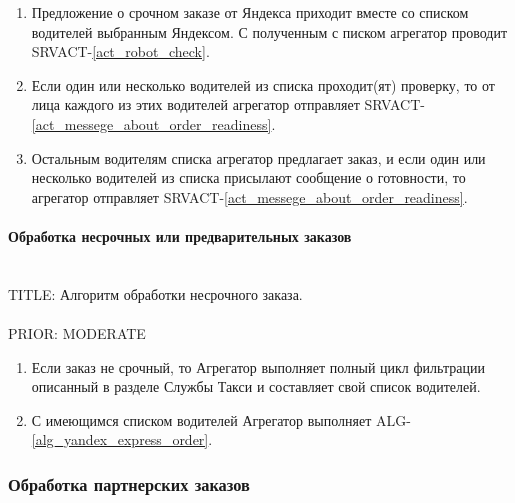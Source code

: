 				\begin{alg} \label{alg_yandex_express_order} \mbox{}

					\begin{enumerate}

						\item Предложение о срочном заказе от Яндекса приходит вместе со списком водителей выбранным Яндексом. С полученным с	писком агрегатор проводит SRVACT-\ref{act_robot_check}.

						\item Если один или несколько водителей из списка проходит(ят) проверку, то от лица каждого из этих водителей агрегатор отправляет SRVACT-\ref{act_messege_about_order_readiness}.
						
						\item Остальным водителям списка агрегатор предлагает заказ, и если один или несколько водителей из списка присылают сообщение о готовности, то агрегатор отправляет SRVACT-\ref{act_messege_about_order_readiness}. 

					\end{enumerate}

				\end{alg}

			\paragraph{Обработка несрочных или предварительных заказов} \mbox{} \\

				TITLE: Алгоритм обработки несрочного заказа.\\
				\\
				PRIOR: MODERATE\\

				\begin{alg} \label{alg_yandex_preliminary_order} \mbox{}

					\begin{enumerate}

						\item Если заказ не срочный, то Агрегатор выполняет полный цикл фильтрации описанный в разделе Службы Такси и составляет свой список водителей. 

						\item С имеющимся списком водителей Агрегатор выполняет ALG-\ref{alg_yandex_express_order}.

					\end{enumerate}

				\end{alg}



		\subsubsection{Обработка партнерских заказов}
